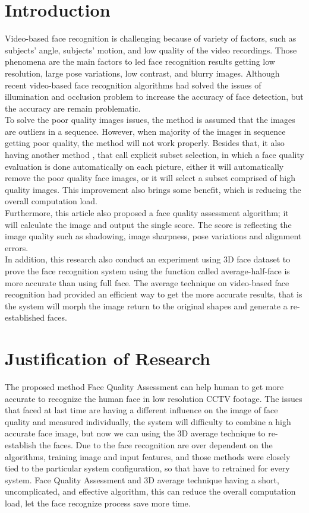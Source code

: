 \documentclass[12pt]{article}
\begin{document}
\section{Introduction}
Video-based face recognition is challenging because of variety of factors, such as subjects’ angle, subjects’ motion, and low quality of the video recordings. Those phenomena are the main factors to led face recognition results getting low resolution, large pose variations, low contrast, and blurry images. Although recent video-based face recognition algorithms had solved the issues of illumination and occlusion problem to increase the accuracy of face detection, but the accuracy are remain problematic.\vspace{3mm}\\ 
To solve the poor quality images issues, the method is assumed that the images are outliers in a sequence. However, when majority of the images in sequence getting poor quality, the method will not work properly.  Besides that, it also having another method , that call explicit subset selection, in which a face quality evaluation is done automatically on each picture,  either it will automatically remove the poor quality face images, or it will select a subset comprised of high quality images. This improvement also brings some benefit, which is reducing the overall computation load. \vspace{3mm}\\ 
Furthermore, this article also proposed a face quality assessment algorithm; it will calculate the image and output the single score.  The score is reflecting the image quality such as shadowing, image sharpness, pose variations and alignment errors.\vspace{3mm}\\ 
In addition, this research also conduct an experiment using 3D face dataset to prove the face recognition system using the function called average-half-face is more accurate than using full face. The average technique on video-based face recognition had provided an efficient way to get the more accurate results, that is the system will morph the image return to the original shapes and generate a re-established faces. 


\section{Justification of Research}
The proposed method Face Quality Assessment can help human to get more accurate to recognize the human face in low resolution CCTV footage.  The issues that faced at last time are having a different  influence on the image of face quality and measured individually,  the system will difficulty to combine a high accurate face image, but now we can using the 3D average technique to re-establish the faces. Due to the face recognition are over dependent on the algorithms, training image and input features, and those methods were closely tied to the particular system configuration, so that have to retrained for every system. Face Quality Assessment and 3D average technique having a short, uncomplicated, and effective algorithm, this can reduce the overall computation load, let the face recognize process save more time.
\end{document}
